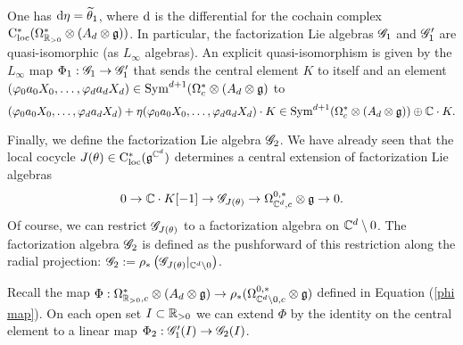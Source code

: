\begin{lem} One has ${\rm d} \eta = \widetilde{\theta}_1$, where ${\rm d}$ is the differential for the cochain complex ${\rm C}_{\rm loc}^*(\Omega^*_{\mathbb R_{>0}} \otimes (A_d \otimes \mathfrak g))$. In particular, the factorization Lie algebras $\mathscr G_1$ and $\mathscr G_1'$ are quasi-isomorphic (as $L_\infty$ algebras). An explicit quasi-isomorphism is given by the $L_\infty$ map $\Phi_1 : \mathscr G_1 \to \mathscr G_1'$ that sends the central element $K$ to itself and an element $(\varphi_0 a_0 X_0,\ldots, \varphi_d a_d X_d) \in {\rm Sym}^{d+1}(\Omega^*_c \otimes (A_d \otimes \mathfrak g)$ to 
\[
(\varphi_0 a_0 X_0,\ldots, \varphi_d a_d X_d) + \eta(\varphi_0 a_0 X_0,\ldots, \varphi_d a_d X_d)\cdot K \in {\rm Sym}^{d+1}(\Omega^*_c \otimes (A_d \otimes \mathfrak g)) \oplus \mathbb C \cdot K .
\]
\end{lem}

Finally, we define the factorization Lie algebra $\mathscr G_2$. We have already seen that the local cocycle $J(\theta) \in {\rm C}_{\rm loc}^*(\mathfrak g^{\mathbb C^d})$ determines a central extension of factorization Lie algebras
\[
0 \to \mathbb C \cdot K[-1] \to \mathscr G_{J(\theta)} \to \Omega^{0,*}_{\mathbb C^d,c} \otimes \mathfrak g \to 0 .
\]
Of course, we can restrict $\mathscr G_{J(\theta)}$ to a factorization algebra on $\mathbb C^d \setminus 0$. The factorization algebra $\mathscr G_2$ is defined as the pushforward of this restriction along the radial projection: $\mathscr G_2 := \rho_* \left(\mathscr G_{J(\theta)}|_{\mathbb C^d \setminus 0}\right)$. 

Recall the map $\Phi : \Omega^*_{\mathbb R_{>0},c} \otimes (A_d \otimes \mathfrak g) \to \rho_*(\Omega^{0,*}_{\mathbb C^d \setminus 0,c} \otimes \mathfrak g)$ defined in Equation (\ref{phi map}). On each open set $I \subset \mathbb R_{>0}$ we can extend $\Phi$ by the identity on the central element to a linear map $\Phi_2 : \mathscr G_1' (I) \to \mathscr G_2 (I)$. 

